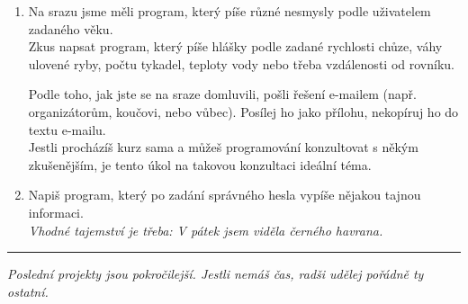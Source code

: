 \documentclass[a4paper,10pt]{article}
\newcommand\startsection[1]{
     \vspace{0.2ex}
    \hrule
    {\fontspec{Oxygen} \tiny
     \vspace{-1ex}
     \emph{#1}
     \vspace{-1.5em}
    }
}
\begin{document}
\begin{enumerate}[resume]

\item Na srazu jsme měli program, který píše různé nesmysly podle uživatelem zadaného věku.
    \\Zkus napsat program, který píše hlášky podle zadané
    rychlosti chůze, váhy ulovené ryby, počtu tykadel, teploty vody
    nebo třeba vzdálenosti od rovníku.

    Podle toho, jak jste se na sraze domluvili, pošli řešení e-mailem
    (např. organizátorům, koučovi, nebo vůbec).
    Posílej ho jako přílohu, nekopíruj ho do textu e-mailu.
    \\Jestli procházíš kurz sama a můžeš programování konzultovat s někým
    zkušenějším, je tento úkol na takovou konzultaci ideální téma.

\item Napiš program, který po zadání správného hesla vypíše nějakou tajnou informaci.
    \\\emph{\small Vhodné tajemství je třeba: V pátek jsem viděla černého havrana.}

\end{enumerate}

\startsection{Poslední projekty jsou pokročilejší.
Jestli nemáš čas, radši udělej pořádně ty ostatní.}
\end{document}
